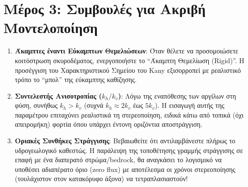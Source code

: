 \documentclass[11pt,a4paper]{article}
\begin{document}
\section{Μέρος 3: Συμβουλές για Ακριβή Μοντελοποίηση}

\begin{enumerate}
  \item \textbf{Άκαμπτες έναντι Εύκαμπτων Θεμελιώσεων}: Όταν θέλετε να προσομοιώσετε κοιτόστρωση σκυροδέματος, ενεργοποιήστε το ``Άκαμπτη Θεμελίωση (Rigid)''. Η προσέγγιση του Χαρακτηριστικού Σημείου του Kany εξισορροπεί με ρεαλιστικό τρόπο το ``μπολ'' της εύκαμπτης καθίζησης.
  \item \textbf{Συντελεστής Ανισοτροπίας ($k_h/k_v$)}: Λόγω της εναπόθεσης των αργίλων στη φύση, συνήθως $k_h > k_v$ (συχνά $k_h \approx 2k_v$ έως $5k_v$). Η εισαγωγή αυτής της παραμέτρου επιταχύνει ρεαλιστικά τη στερεοποίηση, ειδικά κάτω από τοπικά (όχι απειρομήκη) φορτία όπου υπάρχει έντονη οριζόντια αποστράγγιση.
  \item \textbf{Οριακές Συνθήκες Στράγγισης}: Βεβαιωθείτε ότι αντιλαμβάνεστε πλήρως το υδρογεωλογικό καθεστώς. Η παράλειψη της τοποθέτησης γραμμής στράγγισης σε επαφή με ένα διαπερατό στρώμα/bedrock, θα αναγκάσει το λογισμικό να υποθέσει αδιαπέρατο όριο (zero flux) με αποτέλεσμα οι χρόνοι στερεοποίησης (τουλάχιστον στον κατακόρυφο άξονα) να τετραπλασιαστούν!
\end{enumerate}
\end{document}
